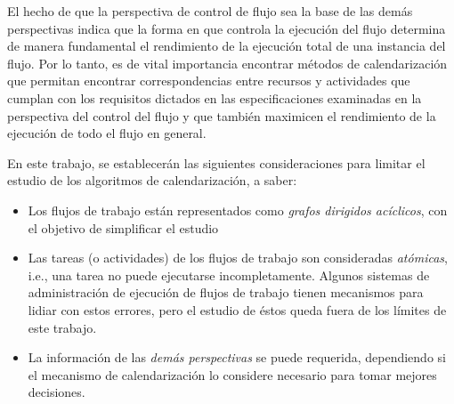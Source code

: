 \documentclass[letterpaper, 12pt]{report}
\begin{document}
El hecho de que la perspectiva de control de flujo sea la base de las demás perspectivas indica que la forma en que controla la ejecución del flujo determina de manera fundamental el rendimiento de la ejecución total de una instancia del flujo. Por lo tanto, es de vital importancia encontrar métodos de calendarización que permitan encontrar correspondencias entre recursos y actividades que cumplan con los requisitos dictados en las especificaciones examinadas en la perspectiva del control del flujo y que también maximicen el rendimiento de la ejecución de todo el flujo en general.

En este trabajo, se establecerán las siguientes consideraciones para limitar el estudio de los algoritmos de calendarización, a saber:

\begin{itemize}
\item{Los flujos de trabajo están representados como \emph{grafos dirigidos acíclicos}, con el objetivo de simplificar el estudio}

\item{Las tareas (o actividades) de los flujos de trabajo son consideradas \emph{atómicas}, i.e., una tarea no puede ejecutarse incompletamente. Algunos sistemas de administración de ejecución de flujos de trabajo tienen mecanismos para lidiar con estos errores, pero el estudio de éstos queda fuera de los límites de este trabajo.}

\item{La información de las \emph{demás perspectivas} se puede requerida, dependiendo si el mecanismo de calendarización lo considere necesario para tomar mejores decisiones.}
\end{itemize}







\end{document}
